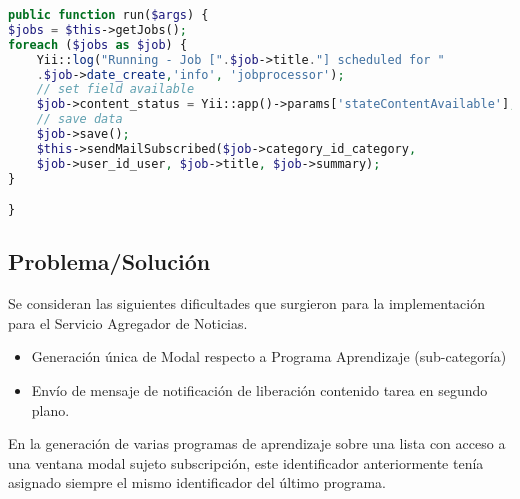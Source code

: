 \begin{lstlisting}[language = PHP]
public function run($args) {	
$jobs = $this->getJobs();
foreach ($jobs as $job) {
	Yii::log("Running - Job [".$job->title."] scheduled for "
	.$job->date_create,'info', 'jobprocessor');
    // set field available
    $job->content_status = Yii::app()->params['stateContentAvailable'];
    // save data
    $job->save();
    $this->sendMailSubscribed($job->category_id_category, 
    $job->user_id_user, $job->title, $job->summary);
}

}
\end{lstlisting}

\subsection{Problema/Soluci\'{o}n}

Se consideran las siguientes dificultades que surgieron para la implementaci\'{o}n
para el Servicio Agregador de Noticias.

\begin{itemize}

\item Generaci\'{o}n \'{u}nica de Modal respecto a Programa Aprendizaje 
(sub-categor\'{i}a)
\item Env\'{i}o de mensaje de notificaci\'{o}n de liberaci\'{o}n contenido tarea
en segundo plano. 

\end{itemize}

En la generaci\'{o}n de varias programas de aprendizaje sobre una lista con acceso a
una ventana modal sujeto subscripci\'{o}n, este identificador anteriormente
ten\'{i}a asignado siempre el mismo identificador del \'{u}ltimo programa.

